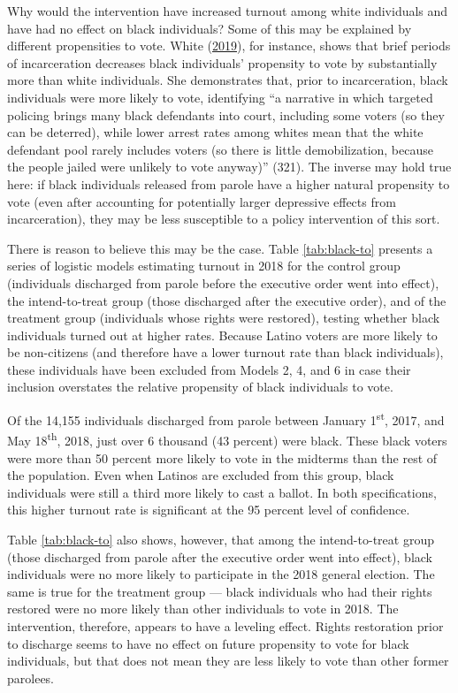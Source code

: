 \documentclass[
  12pt,
]{article}
\begin{document}
Why would the intervention have increased turnout among white individuals and have had no effect on black individuals? Some of this may be explained by different propensities to vote. White (\protect\hyperlink{ref-White2019}{2019}), for instance, shows that brief periods of incarceration decreases black individuals' propensity to vote by substantially more than white individuals. She demonstrates that, prior to incarceration, black individuals were more likely to vote, identifying ``a narrative in which targeted policing brings many black defendants into court, including some voters (so they can be deterred), while lower arrest rates among whites mean that the white defendant pool rarely includes voters (so there is little demobilization, because the people jailed were unlikely to vote anyway)'' (321). The inverse may hold true here: if black individuals released from parole have a higher natural propensity to vote (even after accounting for potentially larger depressive effects from incarceration), they may be less susceptible to a policy intervention of this sort.

There is reason to believe this may be the case. Table \ref{tab:black-to} presents a series of logistic models estimating turnout in 2018 for the control group (individuals discharged from parole before the executive order went into effect), the intend-to-treat group (those discharged after the executive order), and of the treatment group (individuals whose rights were restored), testing whether black individuals turned out at higher rates. Because Latino voters are more likely to be non-citizens (and therefore have a lower turnout rate than black individuals), these individuals have been excluded from Models 2, 4, and 6 in case their inclusion overstates the relative propensity of black individuals to vote.



Of the 14,155 individuals discharged from parole between January 1\textsuperscript{st}, 2017, and May 18\textsuperscript{th}, 2018, just over 6 thousand (43 percent) were black. These black voters were more than 50 percent more likely to vote in the midterms than the rest of the population. Even when Latinos are excluded from this group, black individuals were still a third more likely to cast a ballot. In both specifications, this higher turnout rate is significant at the 95 percent level of confidence.

Table \ref{tab:black-to} also shows, however, that among the intend-to-treat group (those discharged from parole after the executive order went into effect), black individuals were no more likely to participate in the 2018 general election. The same is true for the treatment group --- black individuals who had their rights restored were no more likely than other individuals to vote in 2018. The intervention, therefore, appears to have a leveling effect. Rights restoration prior to discharge seems to have no effect on future propensity to vote for black individuals, but that does not mean they are less likely to vote than other former parolees.
\end{document}

